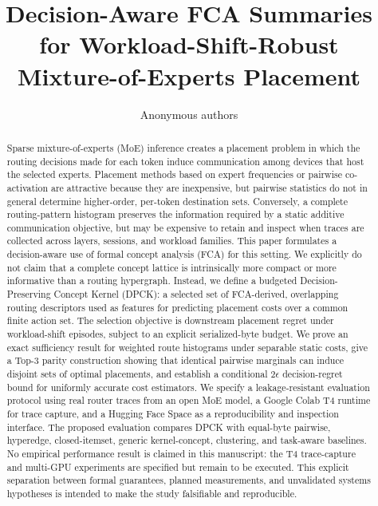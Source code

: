 \documentclass[a4paper,preprint,review,12pt,authoryear]{elsarticle}
\begin{document}
\begin{frontmatter}

\title{Decision-Aware FCA Summaries for Workload-Shift-Robust Mixture-of-Experts Placement}

\author{Anonymous authors}
\address{Submitted for anonymous review}

\begin{abstract}
Sparse mixture-of-experts (MoE) inference creates a placement problem in which the routing decisions made for each token induce communication among devices that host the selected experts. Placement methods based on expert frequencies or pairwise co-activation are attractive because they are inexpensive, but pairwise statistics do not in general determine higher-order, per-token destination sets. Conversely, a complete routing-pattern histogram preserves the information required by a static additive communication objective, but may be expensive to retain and inspect when traces are collected across layers, sessions, and workload families. This paper formulates a decision-aware use of formal concept analysis (FCA) for this setting. We explicitly do not claim that a complete concept lattice is intrinsically more compact or more informative than a routing hypergraph. Instead, we define a budgeted Decision-Preserving Concept Kernel (DPCK): a selected set of FCA-derived, overlapping routing descriptors used as features for predicting placement costs over a common finite action set. The selection objective is downstream placement regret under workload-shift episodes, subject to an explicit serialized-byte budget. We prove an exact sufficiency result for weighted route histograms under separable static costs, give a Top-3 parity construction showing that identical pairwise marginals can induce disjoint sets of optimal placements, and establish a conditional $2\epsilon$ decision-regret bound for uniformly accurate cost estimators. We specify a leakage-resistant evaluation protocol using real router traces from an open MoE model, a Google Colab T4 runtime for trace capture, and a Hugging Face Space as a reproducibility and inspection interface. The proposed evaluation compares DPCK with equal-byte pairwise, hyperedge, closed-itemset, generic kernel-concept, clustering, and task-aware baselines. No empirical performance result is claimed in this manuscript: the T4 trace-capture and multi-GPU experiments are specified but remain to be executed. This explicit separation between formal guarantees, planned measurements, and unvalidated systems hypotheses is intended to make the study falsifiable and reproducible.
\end{abstract}


\end{frontmatter}
\end{document}
